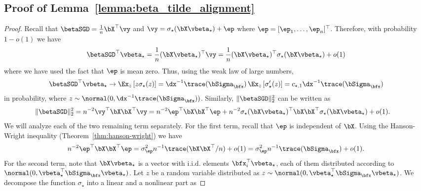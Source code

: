 \subsection{Proof of Lemma~\ref{lemma:beta_tilde_alignment}}
\label{pflemma:beta_tilde_alignment}
\TildeAlignment*
\begin{proof}
    Recall that $\betaSGD = \frac{1}{n} \bX^\top \vy$ and $\vy = \sigma_\star(\bX\vbeta_\star) + \boldsymbol{\ep}$ where $\boldsymbol{\ep} = [\ep_1, \dots, \ep_n]^\top$. Therefore, with probability $1 - o(1)$ we have
    \begin{align*}
        \betaSGD^\top\vbeta_\star = \frac{1}{n} (\bX\vbeta_\star)^\top \vy = \frac{1}{n} (\bX\vbeta_\star)^\top \sigma_\star(\bX\vbeta_\star) + o(1)
    \end{align*}
    where we have used the fact that $\boldsymbol{\ep}$ is mean zero. Thus, using the weak law of large numbers, 
    \begin{align}
    \label{eq:inner}
        \betaSGD^\top\vbeta_\star \to \Ex_{z} \left[z\sigma_\star(z)\right] = \dx^{-1}\trace(\bSigma_\bfx) \,\Ex_{z} \left[\sigma_\star'(z)\right] = c_{\star,1} \dx^{-1}\trace(\bSigma_\bfx)
    \end{align}
    in probability, where $z \sim \normal(0, \dx^{-1}\trace(\bSigma_\bfx))$. Similarly, $\|\betaSGD\|_2^2$ can be written as
    \begin{align*}
        \|\betaSGD\|_2^2 &= n^{-2} \vy^\top \bX \bX^\top \vy = n^{-2} \boldsymbol{\ep}^\top\bX \bX^\top\boldsymbol{\ep}+ n^{-2} \sigma_\star(\bX\vbeta_\star)^\top\bX \bX^\top\sigma_\star(\bX\vbeta_\star) + o(1).
    \end{align*}
    We will analyze each of the two remaining term separately.  For the first term, recall that $\boldsymbol{\ep}$ is independent of $\bX$. Using the Hanson-Wright inequality (Theorem~\ref{thm:hanson-wright}) we have
    \begin{align*}
        n^{-2} \boldsymbol{\ep}^\top\bX \bX^\top\boldsymbol{\ep} =   \sigma_\ep^2 n^{-1} \trace(\bX\bX^\top/n) + o(1) = \sigma_\ep^2 n^{-1}  \trace(\bSigma_\bfx) + o(1).
    \end{align*}
    For the second term, note that $\bX\vbeta_\star$ is a vector with i.i.d. elements $\bfx_i^\top \vbeta_\star$, each of them distributed according to $\normal(0, \vbeta_\star^\top \bSigma_\bfx\vbeta_\star)$. Let $z$ be a random variable distributed as $z \sim \normal(0, \vbeta_\star^\top \bSigma_\bfx\vbeta_\star) $. We decompose the function $\sigma_\star$ into a linear and a nonlinear part as

\end{proof}
